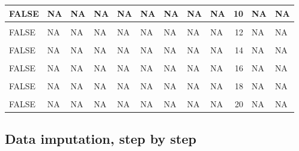 \documentclass[]{article}
\begin{document}
\begin{table}[H]
{\begin{tabular}[t]{l|l|l|l|l|l|l|l|l|r|l|l}
\hline
FALSE & NA & NA & NA & NA & NA & NA & NA & NA & 10 & NA & NA\\
\hline
\cellcolor{gray!6}{FALSE} & \cellcolor{gray!6}{NA} & \cellcolor{gray!6}{NA} & \cellcolor{gray!6}{NA} & \cellcolor{gray!6}{NA} & \cellcolor{gray!6}{NA} & \cellcolor{gray!6}{NA} & \cellcolor{gray!6}{NA} & \cellcolor{gray!6}{NA} & \cellcolor{gray!6}{11} & \cellcolor{gray!6}{NA} & \cellcolor{gray!6}{NA}\\
\hline
FALSE & NA & NA & NA & NA & NA & NA & NA & NA & 12 & NA & NA\\
\hline
\cellcolor{gray!6}{FALSE} & \cellcolor{gray!6}{NA} & \cellcolor{gray!6}{NA} & \cellcolor{gray!6}{NA} & \cellcolor{gray!6}{NA} & \cellcolor{gray!6}{NA} & \cellcolor{gray!6}{NA} & \cellcolor{gray!6}{NA} & \cellcolor{gray!6}{NA} & \cellcolor{gray!6}{13} & \cellcolor{gray!6}{NA} & \cellcolor{gray!6}{NA}\\
\hline
FALSE & NA & NA & NA & NA & NA & NA & NA & NA & 14 & NA & NA\\
\hline
\cellcolor{gray!6}{FALSE} & \cellcolor{gray!6}{NA} & \cellcolor{gray!6}{NA} & \cellcolor{gray!6}{NA} & \cellcolor{gray!6}{NA} & \cellcolor{gray!6}{NA} & \cellcolor{gray!6}{NA} & \cellcolor{gray!6}{NA} & \cellcolor{gray!6}{NA} & \cellcolor{gray!6}{15} & \cellcolor{gray!6}{NA} & \cellcolor{gray!6}{NA}\\
\hline
FALSE & NA & NA & NA & NA & NA & NA & NA & NA & 16 & NA & NA\\
\hline
\cellcolor{gray!6}{FALSE} & \cellcolor{gray!6}{NA} & \cellcolor{gray!6}{NA} & \cellcolor{gray!6}{NA} & \cellcolor{gray!6}{NA} & \cellcolor{gray!6}{NA} & \cellcolor{gray!6}{NA} & \cellcolor{gray!6}{NA} & \cellcolor{gray!6}{NA} & \cellcolor{gray!6}{17} & \cellcolor{gray!6}{NA} & \cellcolor{gray!6}{NA}\\
\hline
FALSE & NA & NA & NA & NA & NA & NA & NA & NA & 18 & NA & NA\\
\hline
\cellcolor{gray!6}{FALSE} & \cellcolor{gray!6}{NA} & \cellcolor{gray!6}{NA} & \cellcolor{gray!6}{NA} & \cellcolor{gray!6}{NA} & \cellcolor{gray!6}{NA} & \cellcolor{gray!6}{NA} & \cellcolor{gray!6}{NA} & \cellcolor{gray!6}{NA} & \cellcolor{gray!6}{19} & \cellcolor{gray!6}{NA} & \cellcolor{gray!6}{NA}\\
\hline
FALSE & NA & NA & NA & NA & NA & NA & NA & NA & 20 & NA & NA\\
\hline
\end{tabular}}
\end{table}

\hypertarget{data-imputation-step-by-step}{%
\subsection{Data imputation, step by
step}\label{data-imputation-step-by-step}}
\end{document}
